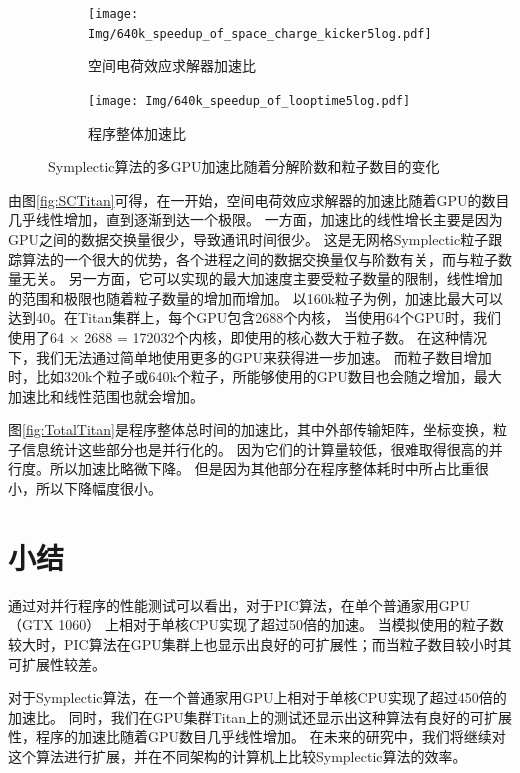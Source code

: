 \begin{figure}[!htb]
    \centering
    \begin{subfigure}[b]{0.9\textwidth}
        \texttt{[image: Img/640k\_speedup\_of\_space\_charge\_kicker5log.pdf]}
        \caption{空间电荷效应求解器加速比}
        \label{fig:SCTitan}
    \end{subfigure}
    \quad
    \begin{subfigure}[b]{0.9\textwidth}
        \texttt{[image: Img/640k\_speedup\_of\_looptime5log.pdf]}
        \caption{程序整体加速比}
        \label{fig:TotalTitan}
    \end{subfigure}
    \caption{Symplectic算法的多GPU加速比随着分解阶数和粒子数目的变化}\label{fig:Titan}
\end{figure}

由图\eqref{fig:SCTitan}可得，在一开始，空间电荷效应求解器的加速比随着GPU的数目几乎线性增加，直到逐渐到达一个极限。
一方面，加速比的线性增长主要是因为GPU之间的数据交换量很少，导致通讯时间很少。
这是无网格Symplectic粒子跟踪算法的一个很大的优势，各个进程之间的数据交换量仅与阶数有关，而与粒子数量无关。
另一方面，它可以实现的最大加速度主要受粒子数量的限制，线性增加的范围和极限也随着粒子数量的增加而增加。
以160k粒子为例，加速比最大可以达到40。在Titan集群上，每个GPU包含2688个内核，
当使用64个GPU时，我们使用了64 $\times$ 2688 = 172032个内核，即使用的核心数大于粒子数。
在这种情况下，我们无法通过简单地使用更多的GPU来获得进一步加速。
而粒子数目增加时，比如320k个粒子或640k个粒子，所能够使用的GPU数目也会随之增加，最大加速比和线性范围也就会增加。

图\eqref{fig:TotalTitan}是程序整体总时间的加速比，其中外部传输矩阵，坐标变换，粒子信息统计这些部分也是并行化的。
因为它们的计算量较低，很难取得很高的并行度。所以加速比略微下降。
但是因为其他部分在程序整体耗时中所占比重很小，所以下降幅度很小。

\section{小结}                      \label{section:Performance_conclusion}
通过对并行程序的性能测试可以看出，对于PIC算法，在单个普通家用GPU （GTX 1060） 上相对于单核CPU实现了超过50倍的加速。
当模拟使用的粒子数较大时，PIC算法在GPU集群上也显示出良好的可扩展性；而当粒子数目较小时其可扩展性较差。

对于Symplectic算法，在一个普通家用GPU上相对于单核CPU实现了超过450倍的加速比。
同时，我们在GPU集群Titan上的测试还显示出这种算法有良好的可扩展性，程序的加速比随着GPU数目几乎线性增加。
在未来的研究中，我们将继续对这个算法进行扩展，并在不同架构的计算机上比较Symplectic算法的效率。